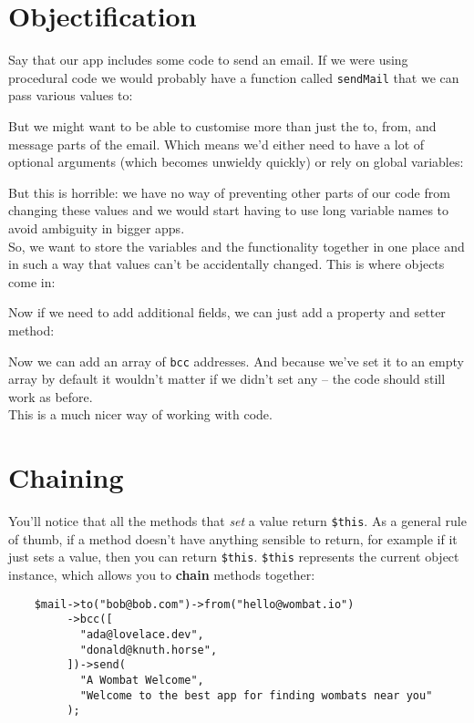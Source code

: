 \section{Objectification}

Say that our app includes some code to send an email. If we were using procedural code we would probably have a function called \texttt{sendMail} that we can pass various values to:


But we might want to be able to customise more than just the to, from, and message parts of the email. Which means we'd either need to have a lot of optional arguments (which becomes unwieldy quickly) or rely on global variables:


But this is horrible: we have no way of preventing other parts of our code from changing these values and we would start having to use long variable names to avoid ambiguity in bigger apps.
\\

So, we want to store the variables and the functionality together in one place and in such a way that values can't be accidentally changed. This is where objects come in:


Now if we need to add additional fields, we can just add a property and setter method:


Now we can add an array of \texttt{bcc} addresses. And because we've set it to an empty array by default it wouldn't matter if we didn't set any – the code should still work as before.
\\

This is a much nicer way of working with code.


\section{Chaining}

You'll notice that all the methods that \textit{set} a value return \texttt{\$this}. As a general rule of thumb, if a method doesn't have anything sensible to return, for example if it just sets a value, then you can return \texttt{\$this}. \texttt{\$this} represents the current object instance, which allows you to \textbf{chain} methods together:

\begin{verbatim}
    $mail->to("bob@bob.com")->from("hello@wombat.io")
         ->bcc([
           "ada@lovelace.dev",
           "donald@knuth.horse",
         ])->send(
           "A Wombat Welcome",
           "Welcome to the best app for finding wombats near you"
         );
\end{verbatim}

